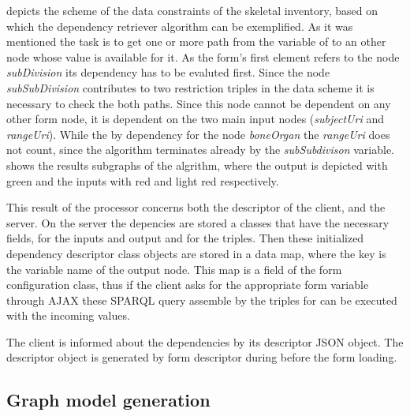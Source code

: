  depicts the scheme of the data constraints of the skeletal inventory, based on which the dependency retriever algorithm can be exemplified. As it was mentioned the task is to get one or more path from the variable of to an other node whose value is available for it.  As the form's first element refers to the node \textit{subDivision} its dependency has to be evaluted first. Since the node \textit{subSubDivision} contributes to two restriction triples in the data scheme it is necessary to check the both paths. Since this node cannot be dependent on any other form node, it is dependent on the two main input nodes (\textit{subjectUri} and \textit{rangeUri}). While the by dependency for the node \textit{boneOrgan} the \textit{rangeUri}
does not count, since the algorithm terminates already by the \textit{subSubdivison} variable.  shows the results subgraphs of the algrithm, where the output is depicted with green and the inputs with red and light red respectively.



This result of the processor concerns both the descriptor of the client, and the server. On the server the depencies are stored a classes that have the necessary fields, for the inputs and output and for the triples. Then these initialized dependency descriptor class objects are stored in a data map, where the key is the variable name of the output node. This map is a field of the form configuration class, thus if the client asks for the appropriate form variable through AJAX these SPARQL query assemble by the triples for can be executed with the incoming values.


The client is informed about the dependencies by its descriptor JSON object. The descriptor object is generated by form descriptor during before the form loading.






\subsection{Graph model generation}  \label{513}





